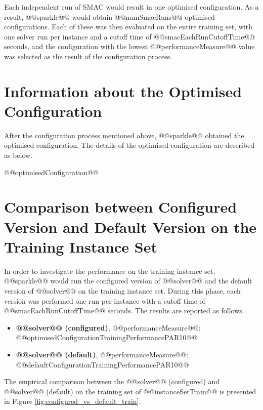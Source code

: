 \documentclass[british]{article}
\begin{document}
Each independent run of SMAC would result in one optimised configuration. As a result, @@sparkle@@ would obtain @@numSmacRuns@@ optimised configurations. Each of these was then evaluated on the entire training set, with one solver run per instance and a cutoff time of @@smacEachRunCutoffTime@@ seconds, and the configuration with the lowest @@performanceMeasure@@ value was selected as the result of the configuration process.

\section{Information about the Optimised Configuration}

After the configuration process mentioned above, @@sparkle@@ obtained the optimised configuration. The details of the optimised configuration are described as below.

\vspace{5mm}

@@optimisedConfiguration@@

\vspace{5mm}


\section{Comparison between Configured Version and Default Version on the Training Instance Set}
In order to investigate the performance on the training instance set, @@sparkle@@ would run the configured version of @@solver@@ and the default version of @@solver@@ on the training instance set. During this phase, each version was performed one run per instance with a cutoff time of @@smacEachRunCutoffTime@@ seconds. The results are reported as follows.

\begin{itemize}
    \item \textbf{@@solver@@ (configured)}, @@performanceMeasure@@: @@optimisedConfigurationTrainingPerformancePAR10@@
    \item \textbf{@@solver@@ (default)}, @@performanceMeasure@@: @@defaultConfigurationTrainingPerformancePAR10@@
\end{itemize}

The empirical comparison between the @@solver@@ (configured) and @@solver@@ (default) on the training set of @@instanceSetTrain@@ is presented in Figure \ref{fig:configured_vs_default_train}.
\end{document}
